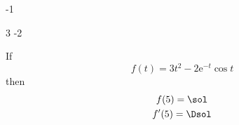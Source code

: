    \SCALEVARIABLEfunction
       {-1}{\EXPfunction}
       {\NEGEXPfunction}

   \PRODUCTfunction
       {\NEGEXPfunction}
       {\COSfunction}
       {\NEGEXPCOSfunction}

   \LINEARCOMBINATIONfunction
       {3}{\SQUAREfunction}
      {-2}{\NEGEXPCOSfunction}
      {\myfunction}


If
\[
    f(t)=3t^2-2\mathrm{e}^{-t}\cos t
\]
then
\[
\begin{gathered}
    f(5)=\sol\\
    f'(5)=\Dsol
\end{gathered}
\]
